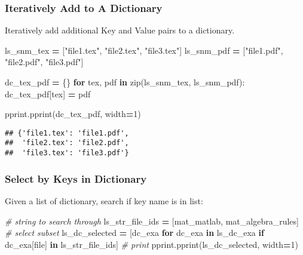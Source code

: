 \documentclass[
]{book}
\newenvironment{Shaded}{\begin{snugshade}}{\end{snugshade}}
\newcommand{\BuiltInTok}[1]{#1}
\newcommand{\CommentTok}[1]{\textcolor[rgb]{0.56,0.35,0.01}{\textit{#1}}}
\newcommand{\ControlFlowTok}[1]{\textcolor[rgb]{0.13,0.29,0.53}{\textbf{#1}}}
\newcommand{\DecValTok}[1]{\textcolor[rgb]{0.00,0.00,0.81}{#1}}
\newcommand{\KeywordTok}[1]{\textcolor[rgb]{0.13,0.29,0.53}{\textbf{#1}}}
\newcommand{\NormalTok}[1]{#1}
\newcommand{\OperatorTok}[1]{\textcolor[rgb]{0.81,0.36,0.00}{\textbf{#1}}}
\newcommand{\StringTok}[1]{\textcolor[rgb]{0.31,0.60,0.02}{#1}}
\begin{document}
\hypertarget{iteratively-add-to-a-dictionary}{%
\subsubsection{Iteratively Add to A Dictionary}\label{iteratively-add-to-a-dictionary}}

Iteratively add additional Key and Value pairs to a dictionary.

\begin{Shaded}
\begin{Highlighting}[]
\NormalTok{ls\_snm\_tex }\OperatorTok{=}\NormalTok{ [}\StringTok{"file1.tex"}\NormalTok{, }\StringTok{"file2.tex"}\NormalTok{, }\StringTok{"file3.tex"}\NormalTok{]}
\NormalTok{ls\_snm\_pdf }\OperatorTok{=}\NormalTok{ [}\StringTok{"file1.pdf"}\NormalTok{, }\StringTok{"file2.pdf"}\NormalTok{, }\StringTok{"file3.pdf"}\NormalTok{]}

\NormalTok{dc\_tex\_pdf }\OperatorTok{=}\NormalTok{ \{\}}
\ControlFlowTok{for}\NormalTok{ tex, pdf }\KeywordTok{in} \BuiltInTok{zip}\NormalTok{(ls\_snm\_tex, ls\_snm\_pdf):}
\NormalTok{  dc\_tex\_pdf[tex] }\OperatorTok{=}\NormalTok{ pdf}

\NormalTok{pprint.pprint(dc\_tex\_pdf, width}\OperatorTok{=}\DecValTok{1}\NormalTok{)}
\end{Highlighting}
\end{Shaded}

\begin{verbatim}
## {'file1.tex': 'file1.pdf',
##  'file2.tex': 'file2.pdf',
##  'file3.tex': 'file3.pdf'}
\end{verbatim}

\hypertarget{select-by-keys-in-dictionary}{%
\subsubsection{Select by Keys in Dictionary}\label{select-by-keys-in-dictionary}}

Given a list of dictionary, search if key name is in list:

\begin{Shaded}
\begin{Highlighting}[]
\CommentTok{\# string to search through}
\NormalTok{ls\_str\_file\_ids }\OperatorTok{=}\NormalTok{ [}\StringTok{\textquotesingle{}mat\_matlab\textquotesingle{}}\NormalTok{, }\StringTok{\textquotesingle{}mat\_algebra\_rules\textquotesingle{}}\NormalTok{]}
\CommentTok{\# select subset}
\NormalTok{ls\_dc\_selected }\OperatorTok{=}\NormalTok{ [dc\_exa}
                  \ControlFlowTok{for}\NormalTok{ dc\_exa }\KeywordTok{in}\NormalTok{ ls\_dc\_exa}
                  \ControlFlowTok{if}\NormalTok{ dc\_exa[}\StringTok{\textquotesingle{}file\textquotesingle{}}\NormalTok{] }\KeywordTok{in}\NormalTok{ ls\_str\_file\_ids]}
\CommentTok{\# print}
\NormalTok{pprint.pprint(ls\_dc\_selected, width}\OperatorTok{=}\DecValTok{1}\NormalTok{)}
\end{Highlighting}
\end{Shaded}
\end{document}
